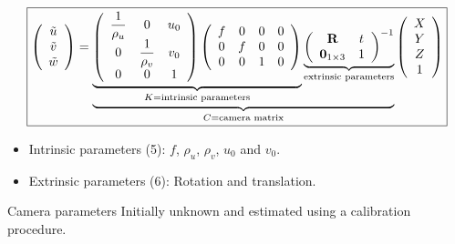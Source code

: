 \begin{frame}
\[
\boxed{
\left (
\begin{array}{c}
\tilde{u} \\
\tilde{v} \\
\tilde{w}
\end{array}
\right )
=
\underbrace{
\underbrace{
\left (
\begin{array}{ccc}
\dfrac{1}{\rho_u} & 0 & u_{0} \\
0 & \dfrac{1}{\rho_v} & v_{0} \\
0 & 0 & 1
\end{array}
\right )
\left (
\begin{array}{cccc}
f & 0 & 0 & 0 \\
0 & f & 0 & 0 \\
0 & 0 & 1 & 0
\end{array}
\right )
}_{K=\text{intrinsic parameters}}
\underbrace{
\left (
\begin{array}{cc}
\textbf{\text{R}} & t \\
\textbf{\text{0}}_{1\times 3} & 1
\end{array}
\right )^{-1}
}_{\text{extrinsic parameters}}
}_{C = \text{camera matrix}}
\left (
\begin{array}{c}
X \\
Y \\
Z \\
1
\end{array}
\right )
}
\]
\begin{itemize}
\item Intrinsic parameters (5): $f$, $\rho_u$, $\rho_v$, $u_0$ and $v_0$.
\item Extrinsic parameters (6): Rotation and translation.
\end{itemize}
\begin{block}{Camera parameters}
Initially unknown and estimated using a calibration procedure.
\end{block}
\end{frame}

